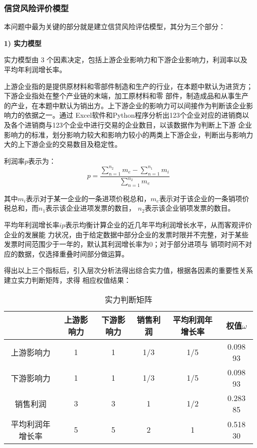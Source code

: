 \documentclass[withoutpreface,bwprint]{cumcmthesis}
\begin{document}
\subsubsection{信贷风险评价模型}
本问题中最为关键的部分就是建立信贷风险评估模型，其分为三个部分：

    \textbf{1) 实力模型}
    
    实力模型由 3 个因素决定，包括上游企业影响力和下游企业影响力，利润率以及平均年利润增长率。

    上游企业指的是提供原材料和零部件制造和生产的行业，在本题中默认为进货方；下游企业指处在整个产业链的末端，加工原材料和零
    部件，制造成品和从事生产的产业，在本题中默认为销出方。上下游企业的影响力可以间接作为判断该企业影响力的依据之一。通过
    Excel软件和Python程序分析出123个企业对应的进销商以及各个进销商与123个企业中进行交易的企业数目，以该数据作为判断上下游
    企业影响力的标准，划分影响力较大和影响力较小的两类上下游企业，判断出与影响力大的上下游企业的交易数目及稳定性。

    利润率$p$表示为：
    \begin{equation}
        p = \frac{\sum_{n = 1}^{n_2} m_e - \sum_{n = 1}^{n_1}m_i}{\sum_{n=1}^{n_2}m_e}   
    \end{equation}
    
    其中$m_i$表示对于某一企业的一条进项价税总和，$m_e$表示对于该企业的一条销项价税总和，而$n_1$表示该企业进项发票的数目，
    $n_2$表示该企业销项发票的数目。
    
    平均年利润增长率$ip$表示均衡计算企业的近几年平均利润增长水平，从而客观评价企业的发展能
    力状况，由于给定数据中部分企业的发票时限并不完整，对于某些发票时间范围少于一年的，默认其利润增长率为0；对于部分进项与
    销项时间不对应的数据，仅选择重叠时间部分做运算。

    得出以上三个指标后，引入层次分析法得出综合实力值，根据各因素的重要性关系建立实力判断矩阵，求得
    相应权值结果：
    \begin{table}[!htbp]
        \caption{实力判断矩阵}\label{tab:003} 
        \raggedleft
        \begin{tabular}{cccccc}
            \toprule[1.5pt]
             & 上游影响力 & 下游影响力 & 销售利润 & 平均利润年增长率 & 权值$\omega$\\
            \midrule[1pt]
            上游影响力 & 1 & 1 & 1/3 & 1/5 & 0.098 93\\
            下游影响力 & 1 & 1 & 1/3 & 1/5 & 0.098 93\\
            销售利润 & 3 & 3 & 1 & 1/2 & 0.283 85\\
            平均利润年增长率 & 5 & 5 & 2 & 1 & 0.518 30\\
            \bottomrule[1.5pt]
        \end{tabular}
    \end{table}
\end{document}
